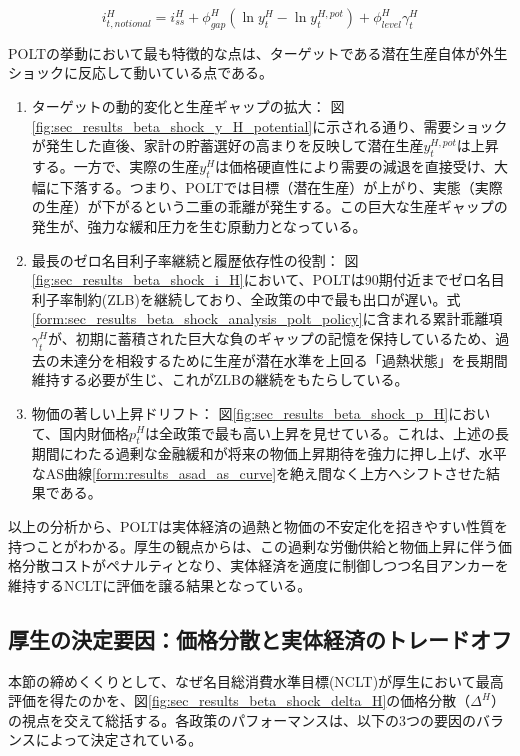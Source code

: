 \begin{equation}
i_{t,notional}^H=i_{ss}^H+\phi_{gap}^H(\ln y_t^H-\ln y_t^{H,pot})+\phi_{level}^H\gamma_t^H
\label{form:sec_results_beta_shock_analysis_polt_policy}
\end{equation}

POLTの挙動において最も特徴的な点は、ターゲットである潜在生産自体が外生ショックに反応して動いている点である。

\begin{enumerate}
    \item\label{itm:sec_results_beta_shock_analysis_polt_potential} ターゲットの動的変化と生産ギャップの拡大：
    図\ref{fig:sec_results_beta_shock_y_H_potential}に示される通り、需要ショックが発生した直後、家計の貯蓄選好の高まりを反映して潜在生産\(y_t^{H,pot}\)は上昇する。一方で、実際の生産\(y_t^H\)は価格硬直性により需要の減退を直接受け、大幅に下落する。つまり、POLTでは目標（潜在生産）が上がり、実態（実際の生産）が下がるという二重の乖離が発生する。この巨大な生産ギャップの発生が、強力な緩和圧力を生む原動力となっている。
    \item\label{itm:sec_results_beta_shock_analysis_polt_zlb} 最長のゼロ名目利子率継続と履歴依存性の役割：
    図\ref{fig:sec_results_beta_shock_i_H}において、POLTは90期付近までゼロ名目利子率制約(ZLB)を継続しており、全政策の中で最も出口が遅い。式\eqref{form:sec_results_beta_shock_analysis_polt_policy}に含まれる累計乖離項\(\gamma_t^H\)が、初期に蓄積された巨大な負のギャップの記憶を保持しているため、過去の未達分を相殺するために生産が潜在水準を上回る「過熱状態」を長期間維持する必要が生じ、これがZLBの継続をもたらしている。
    \item\label{itm:sec_results_beta_shock_analysis_polt_drift} 物価の著しい上昇ドリフト：
    図\ref{fig:sec_results_beta_shock_p_H}において、国内財価格\(p_t^H\)は全政策で最も高い上昇を見せている。これは、上述の長期間にわたる過剰な金融緩和が将来の物価上昇期待を強力に押し上げ、水平なAS曲線\eqref{form:results_asad_as_curve}を絶え間なく上方へシフトさせた結果である。
\end{enumerate}

以上の分析から、POLTは実体経済の過熱と物価の不安定化を招きやすい性質を持つことがわかる。厚生の観点からは、この過剰な労働供給と物価上昇に伴う価格分散コストがペナルティとなり、実体経済を適度に制御しつつ名目アンカーを維持するNCLTに評価を譲る結果となっている。

\subsection{厚生の決定要因：価格分散と実体経済のトレードオフ}
\label{sec:sec_results_beta_shock_welfare_factors}
本節の締めくくりとして、なぜ名目総消費水準目標(NCLT)が厚生において最高評価を得たのかを、図\ref{fig:sec_results_beta_shock_delta_H}の価格分散（\(\Delta^H\)）の視点を交えて総括する。各政策のパフォーマンスは、以下の3つの要因のバランスによって決定されている。

